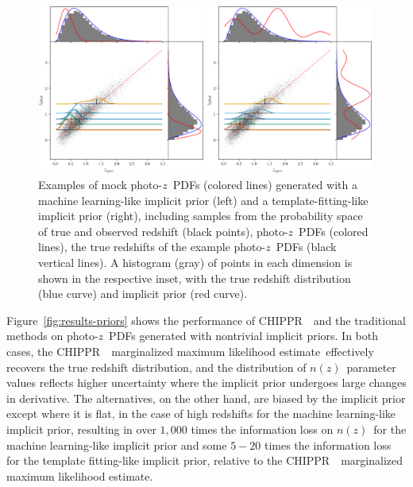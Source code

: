 \documentclass[iop]{emulateapj}
\newcommand{\Fig}[1]{Figure~\ref{#1}}
\newcommand{\project}[1]{{\textsc{#1}}~}
\newcommand{\Chippr}{\project{CHIPPR}}
\newcommand{\nz}{$n(z)$}
\newcommand{\pz}{photo-$z$~}
\newcommand{\pzpdf}{\pz PDF}
\newcommand{\mmle}{marginalized maximum likelihood estimate}
\begin{document}
\begin{figure}
	
\includegraphics[width=0.49\textwidth]{figures/chippr/samplepzs_trpr.png}
	
\includegraphics[width=0.49\textwidth]{figures/chippr/samplepzs_tmpr.png}
	\caption{
		Examples of mock \pzpdf s (colored lines) generated with a 
machine learning-like implicit prior (left) and a template-fitting-like 
implicit prior (right), including samples from the probability space of true 
and observed redshift (black points), \pzpdf s (colored lines), the true 
redshifts of the example \pzpdf s (black vertical lines).
		A histogram (gray) of points in each dimension is shown in the 
respective inset, with the true redshift distribution (blue curve) and implicit 
prior (red curve).
	}
	\label{fig:pzs-priors}
\end{figure}

\Fig{fig:results-priors} shows the performance of \Chippr\ and the traditional 
methods on \pzpdf s generated with nontrivial implicit priors.
In both cases, the \Chippr\ \mmle\ effectively recovers the true redshift 
distribution, and the distribution of \nz\ parameter values reflects higher 
uncertainty where the implicit prior undergoes large changes in derivative.
The alternatives, on the other hand, are biased by the implicit prior except 
where it is flat, in the case of high redshifts for the machine learning-like 
implicit prior, resulting in over $1,000$ times the information loss on \nz\ 
for the machine learning-like implicit prior and some $5-20$ times the 
information loss for the template fitting-like implicit prior, relative to the 
\Chippr\ \mmle.
\end{document}
